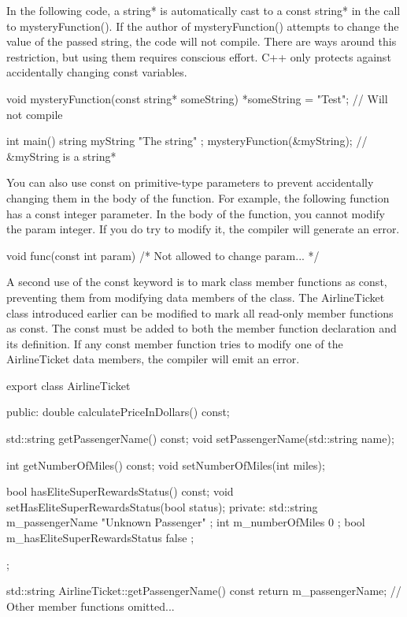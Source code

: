 In the following code, a string* is automatically cast to a const string* in the call to mysteryFunction(). If the author of mysteryFunction() attempts to change the value of the passed string, the code will not compile. There are ways around this restriction, but using them requires conscious effort. C++ only protects against accidentally changing const variables.

\begin{cpp}
void mysteryFunction(const string* someString)
{
    *someString = "Test"; // Will not compile
}

int main()
{
    string myString { "The string" };
    mysteryFunction(&myString); // &myString is a string*
}
\end{cpp}

You can also use const on primitive-type parameters to prevent accidentally changing them in the body of the function. For example, the following function has a const integer parameter. In the body of the function, you cannot modify the param integer. If you do try to modify it, the compiler will generate an error.

\begin{cpp}
void func(const int param) { /* Not allowed to change param... */ }
\end{cpp}


A second use of the const keyword is to mark class member functions as const, preventing them from modifying data members of the class. The AirlineTicket class introduced earlier can be modified to mark all read-only member functions as const. The const must be added to both the member function declaration and its definition. If any const member function tries to modify one of the AirlineTicket data members, the compiler will emit an error.

\begin{cpp}
export class AirlineTicket
{
    public:
        double calculatePriceInDollars() const;

        std::string getPassengerName() const;
        void setPassengerName(std::string name);

        int getNumberOfMiles() const;
        void setNumberOfMiles(int miles);

        bool hasEliteSuperRewardsStatus() const;
        void setHasEliteSuperRewardsStatus(bool status);
    private:
        std::string m_passengerName { "Unknown Passenger" };
        int m_numberOfMiles { 0 };
        bool m_hasEliteSuperRewardsStatus { false };
};

std::string AirlineTicket::getPassengerName() const
{
    return m_passengerName;
}
// Other member functions omitted...
\end{cpp}

